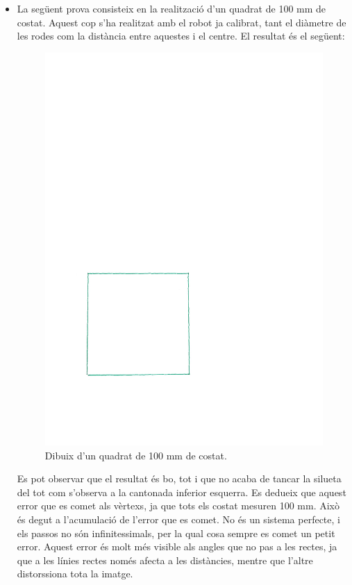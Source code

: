\begin{itemize}
	\item La següent prova consisteix en la realització d'un quadrat de 100 mm de costat. Aquest cop s'ha realitzat amb el robot ja calibrat, tant el diàmetre de les rodes com la distància entre aquestes i el centre. El resultat és el següent:
	\begin{figure}[H]
		\centering
		\includegraphics{resultatQuadrat}
		\caption{Dibuix d'un quadrat de 100 mm de costat.}
		\label{fig:quadrat}
	\end{figure}
	Es pot observar que el resultat és bo, tot i que no acaba de tancar la silueta del tot com s'observa a la cantonada inferior esquerra. Es dedueix que aquest error que es comet als vèrtexs, ja que tots els costat mesuren 100 mm. Això és degut a l'acumulació de l'error que es comet. No és un sistema perfecte, i els passos no són infinitessimals, per la qual cosa sempre es comet un petit error. Aquest error és molt més visible als angles que no pas a les rectes, ja que a les línies rectes només afecta a les distàncies, mentre que l'altre distorssiona tota la imatge. 
	

\end{itemize}
